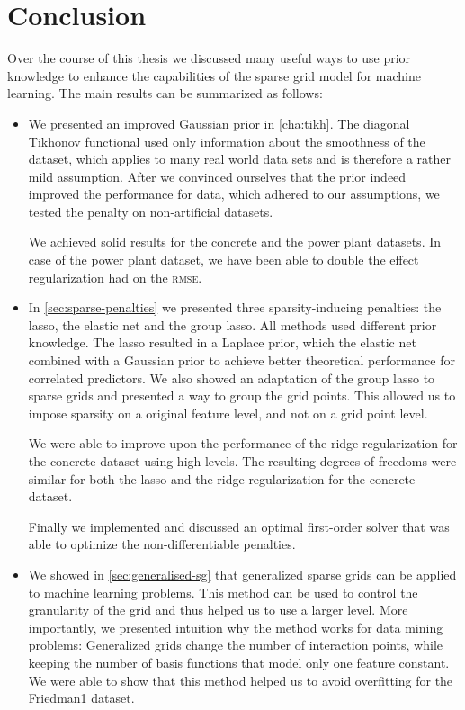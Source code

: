 
\chapter{Conclusion}
\label{chap:conclusion}
Over the course of this thesis we discussed many useful ways to use prior
knowledge to enhance the capabilities of the sparse grid model for machine
learning.
The main results can be summarized as follows:
\begin{itemize}
\item We presented an improved Gaussian prior in \cref{cha:tikh}.
The diagonal Tikhonov functional used only information about the smoothness of the dataset, which applies to many real world data sets and is therefore a rather mild assumption.
After we convinced ourselves that the prior indeed improved the performance for
data, which adhered to our assumptions, we tested the penalty on non-artificial datasets.

We achieved solid results for the concrete and the power plant datasets.
In case of the power plant dataset, we have been able to double the effect regularization had on the \textsc{rmse}.
\item In \cref{sec:sparse-penalties} we presented three sparsity-inducing
  penalties: the lasso, the elastic net and the group lasso.
  All methods used different prior knowledge.
  The lasso resulted in a Laplace prior, which the elastic net combined with
  a Gaussian prior to achieve better theoretical performance for correlated
  predictors.
  We also showed an adaptation of the group lasso to sparse grids and presented a
  way to group the grid points.
  This allowed us to impose sparsity on a original feature level, and not on a
  grid point level.

  We were able to improve upon the performance of the ridge regularization for
  the concrete dataset using high levels.
  The resulting degrees of freedoms were similar for both the lasso and the ridge regularization for the concrete dataset.

  Finally we implemented and discussed an optimal first-order solver \fista that was able to optimize the non-differentiable penalties.
\item We showed in \cref{sec:generalised-sg} that generalized sparse grids can be
  applied to machine learning problems.
  This method can be used to control the granularity of the grid and thus helped
  us to use a larger level.
  More importantly, we presented intuition why the method works for data mining
  problems:
  Generalized grids change the number of interaction points, while keeping the number of basis functions that model only one feature constant.
  We were able to show that this method helped us to avoid overfitting for the Friedman1 dataset.


\end{itemize}
